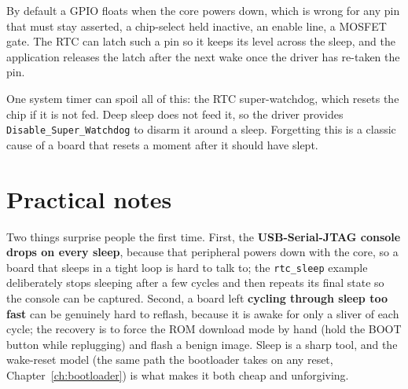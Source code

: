 By default a GPIO floats when the core powers down, which is wrong for any pin that
must stay asserted, a chip-select held inactive, an enable line, a MOSFET gate. The
RTC can latch such a pin so it keeps its level across the sleep, and the application
releases the latch after the next wake once the driver has re-taken the pin.

One system timer can spoil all of this: the RTC super-watchdog, which resets the chip
if it is not fed. Deep sleep does not feed it, so the driver provides
\texttt{Disable\_Super\_Watchdog} to disarm it around a sleep. Forgetting this is a
classic cause of a board that resets a moment after it should have slept.

\section{Practical notes}


Two things surprise people the first time. First, the \textbf{USB-Serial-JTAG console
drops on every sleep}, because that peripheral powers down with the core, so a board
that sleeps in a tight loop is hard to talk to; the \texttt{rtc\_sleep} example
deliberately stops sleeping after a few cycles and then repeats its final state so
the console can be captured. Second, a board left \textbf{cycling through sleep too
fast} can be genuinely hard to reflash, because it is awake for only a sliver of each
cycle; the recovery is to force the ROM download mode by hand (hold the BOOT button
while replugging) and flash a benign image. Sleep is a sharp tool, and the wake-reset
model (the same path the bootloader takes on any reset, Chapter~\ref{ch:bootloader})
is what makes it both cheap and unforgiving.

